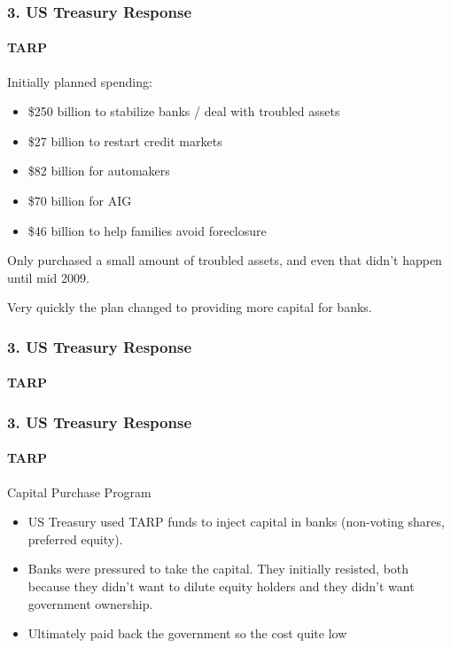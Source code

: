 \documentclass{beamer}
\begin{document}
\begin{frame}[t]
    \frametitle{3. US Treasury Response}
    \framesubtitle{TARP}

    Initially planned spending:
    \begin{itemize}
        \item \$250 billion to stabilize banks / deal with troubled assets
        \item \$27 billion to restart credit markets
        \item \$82 billion for automakers
        \item \$70 billion for AIG
        \item \$46 billion to help families avoid foreclosure
    \end{itemize}
    \vspace{1em}

    Only purchased a small amount of troubled assets, and even that didn’t happen until mid 2009.
    \vspace{1em}

    Very quickly the plan changed to providing more capital for banks.

\end{frame}

\begin{frame}[t]
    \frametitle{3. US Treasury Response}
    \framesubtitle{TARP}

    

\end{frame}

\begin{frame}[t]
    \frametitle{3. US Treasury Response}
    \framesubtitle{TARP}

    Capital Purchase Program 
    \begin{itemize}
        \item US Treasury used TARP funds to inject capital in banks (non-voting shares, preferred equity).
        \item Banks were pressured to take the capital.  They initially resisted, both because they didn’t want to dilute equity holders and they didn’t want government ownership.
        \item Ultimately paid back the government so the cost quite low
    \end{itemize}

\end{frame}
\end{document}
